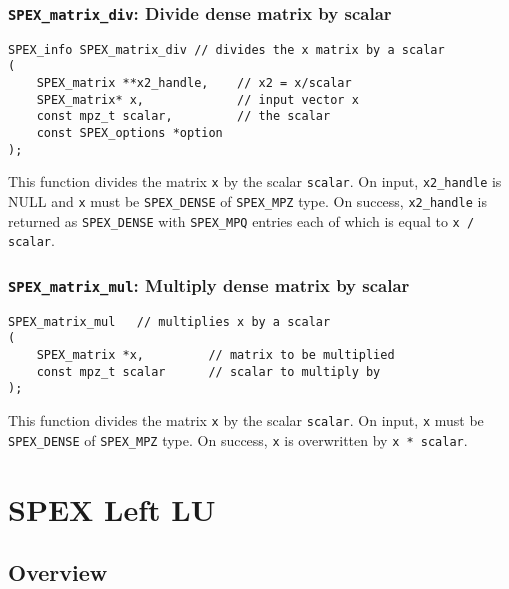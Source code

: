 \documentclass[12pt]{report}
\theoremstyle{definition}
\begin{document}
\cprotect\subsection{\verb|SPEX_matrix_div|: Divide dense matrix by scalar}

\begin{mdframed}[userdefinedwidth=6in]
{\footnotesize
\begin{verbatim}
SPEX_info SPEX_matrix_div // divides the x matrix by a scalar
(
    SPEX_matrix **x2_handle,    // x2 = x/scalar
    SPEX_matrix* x,             // input vector x
    const mpz_t scalar,         // the scalar
    const SPEX_options *option
);
\end{verbatim}
} \end{mdframed}

This function divides the matrix \verb|x| by the scalar \verb|scalar|. On input, \verb|x2_handle| is NULL and \verb|x| must be \verb|SPEX_DENSE| of \verb|SPEX_MPZ| type. On success, \verb|x2_handle| is returned as \verb|SPEX_DENSE| with \verb|SPEX_MPQ| entries each of which is equal to \verb|x / scalar|.

\cprotect\subsection{\verb|SPEX_matrix_mul|: Multiply dense matrix by scalar}

\begin{mdframed}[userdefinedwidth=6in]
{\footnotesize
\begin{verbatim}
SPEX_matrix_mul   // multiplies x by a scalar
(
    SPEX_matrix *x,         // matrix to be multiplied
    const mpz_t scalar      // scalar to multiply by
);
\end{verbatim}
} \end{mdframed}

This function divides the matrix \verb|x| by the scalar \verb|scalar|. On input, \verb|x| must be \verb|SPEX_DENSE| of \verb|SPEX_MPZ| type. On success, \verb|x| is overwritten by \verb|x * scalar|.



\chapter{SPEX Left LU} \label{ch:LeftLU}

\section{Overview} \label{s:LeftLU:intro}
\end{document}
